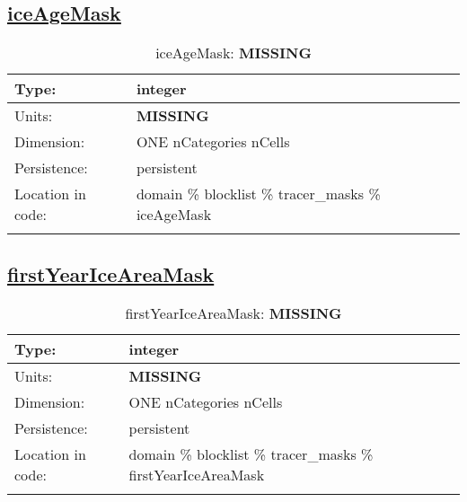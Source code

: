 \subsection[iceAgeMask]{\hyperref[sec:var_tab_tracer_masks]{iceAgeMask}}
\label{subsec:var_sec_tracer_masks_iceAgeMask}
\begin{center}
\begin{longtable}{| p{2.0in} | p{4.0in} |}
        \hline 
        Type: & integer \\
        \hline 
        Units: & {\bf \color{red} MISSING} \\
        \hline 
        Dimension: & ONE nCategories nCells \\
        \hline 
        Persistence: & persistent \\
        \hline 
         Location in code: & domain \% blocklist \% tracer\_masks \% iceAgeMask \\
         \hline 
    \caption{iceAgeMask: {\bf \color{red} MISSING}}
\end{longtable}
\end{center}
\subsection[firstYearIceAreaMask]{\hyperref[sec:var_tab_tracer_masks]{firstYearIceAreaMask}}
\label{subsec:var_sec_tracer_masks_firstYearIceAreaMask}
\begin{center}
\begin{longtable}{| p{2.0in} | p{4.0in} |}
        \hline 
        Type: & integer \\
        \hline 
        Units: & {\bf \color{red} MISSING} \\
        \hline 
        Dimension: & ONE nCategories nCells \\
        \hline 
        Persistence: & persistent \\
        \hline 
         Location in code: & domain \% blocklist \% tracer\_masks \% firstYearIceAreaMask \\
         \hline 
    \caption{firstYearIceAreaMask: {\bf \color{red} MISSING}}
\end{longtable}
\end{center}

